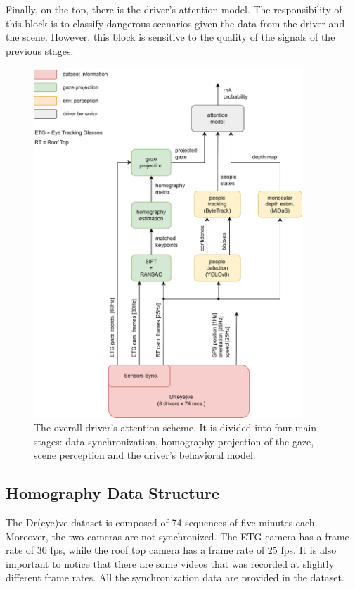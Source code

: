 Finally, on the top, there is the driver's attention model. The responsibility 
of this block is to classify dangerous scenarios given the data from the 
driver and the scene. However, this block is sensitive to the quality of the 
signals of the previous stages.

\begin{figure}
    \centering
    \includegraphics[width=0.9\textwidth]{images/dreyeve/classic_scheme.png}
    \vspace*{0.6cm}
    \caption[Traditional computer vision-based driver's attention model]
    {The overall driver's attention scheme. It is divided into four main 
    stages: data synchronization, homography projection of the gaze, scene 
    perception and the driver's behavioral model.
    }
    \label{fig:driver_attention}
\end{figure}

\subsection{Homography Data Structure}
The Dr(eye)ve dataset is composed of 74 sequences of five minutes each. 
Moreover, the two cameras are not synchronized. 
The ETG camera has a frame rate of 30 fps, while the roof top camera has a 
frame rate of 25 fps. It is also important to notice that there are some videos 
that was recorded at slightly different frame rates. All the synchronization data 
are provided in the dataset.

